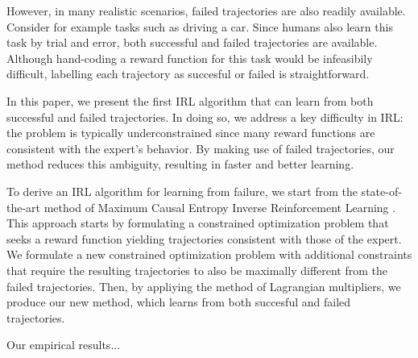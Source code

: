 \documentclass[conference]{IEEEtran}
\begin{document}
However, in many realistic scenarios, failed trajectories are also readily available.  Consider for example tasks such as driving a car.  Since humans also learn this task by trial and error, both successful and failed trajectories are available.  Although hand-coding a reward function for this task would be infeasibily difficult, labelling each trajectory as succesful or failed is straightforward.  

In this paper, we present the first IRL algorithm that can learn from both successful and failed trajectories.  In doing so, we address a key difficulty in IRL: the problem is typically underconstrained since many reward functions are consistent with the expert's behavior.  By making use of failed trajectories, our method reduces this ambiguity, resulting in faster and better learning.

To derive an IRL algorithm for learning from failure, we start from the state-of-the-art method of Maximum Causal Entropy Inverse Reinforcement Learning \cite{ziebart2008maximum}.  This approach starts by formulating a constrained optimization problem that seeks a reward function yielding trajectories consistent with those of the expert.  We formulate a new constrained optimization problem with additional constraints that require the resulting trajectories to also be maximally different from the failed trajectories.  Then, by appliying the method of Lagrangian multipliers, we produce our new method, which learns from both succesful and failed trajectories.

Our empirical results...


\end{document}
